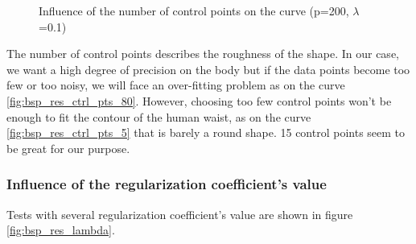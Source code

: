 \documentclass{article}
\begin{document}
\begin{figure}[H]
{        }
    \caption[Influence of the number of control points on the curve]{Influence of the number of control points on the curve (p=200, $\lambda$=0.1)}
    \label{fig:bsp_res_ctrl_pts}
\end{figure}

The number of control points describes the roughness of the shape. In our case, we want a high degree of precision on the body but if the data points become too few or too noisy, we will face an over-fitting problem as on the curve \ref{fig:bsp_res_ctrl_pts_80}. However, choosing too few control points won't be enough to fit the contour of the human waist, as on the curve \ref{fig:bsp_res_ctrl_pts_5} that is barely a round shape. 15 control points seem to be great for our purpose. 

\subsubsection{Influence of the regularization coefficient's value} \label{sec:influence_lambda}

Tests with several regularization coefficient's value are shown in figure \ref{fig:bsp_res_lambda}.
\end{document}

